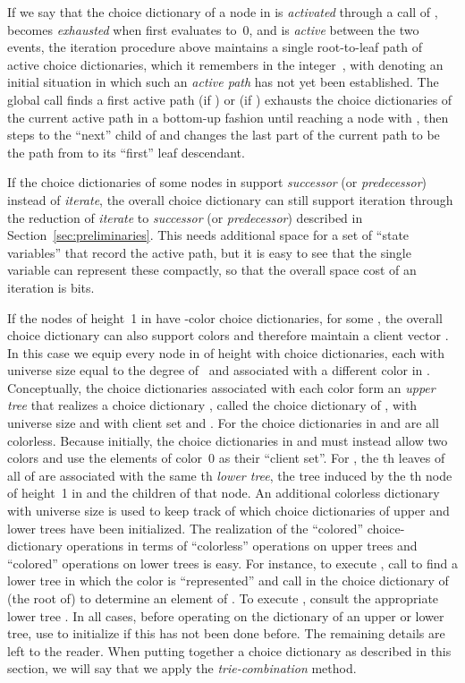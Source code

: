 \documentclass[envcountsame,envcountsect,undated,nolinenumbers]{lnthi}
\def\Tvn#1{\hbox{\textit{#1\/}}}
\begin{document}
\noindent
If we say that the choice dictionary of
a node  in  is \emph{activated}
through a call of ,
becomes \emph{exhausted} when
 first evaluates to~0,
and is \emph{active} between the two events,
the iteration procedure above maintains a single
root-to-leaf path of active choice dictionaries,
which it remembers in the integer~, with
 denoting an initial situation in which
such an \emph{active path} has not yet been
established.
The global call 
finds a first active path (if ) or
(if ) exhausts the choice dictionaries of 
the current active path in a bottom-up fashion
until reaching a node  with
,
then steps to the ``next'' child  of  and
changes the last part of the current path to
be the path from  to its ``first'' leaf descendant.

If the choice dictionaries of some nodes in 
support \Tvn{successor} (or \Tvn{predecessor})
instead of \Tvn{iterate}, the overall choice dictionary
can still support iteration through the reduction
of \Tvn{iterate} to
\Tvn{successor} (or \Tvn{predecessor})
described in Section~\ref{sec:preliminaries}.
This needs additional space for a set of
``state variables'' that record the active path,
but it is easy to see that
the single variable  can
represent these compactly,
so that the overall space cost of an iteration
is  bits.

If the nodes of height~1 in  have
-color choice dictionaries, for some ,
the overall choice dictionary can also support
 colors and therefore maintain a client vector
.
In this case we equip every node  in 
of height  with 
choice dictionaries, each with universe size
equal to the degree of~ and associated
with a different color in .
Conceptually, the choice dictionaries
associated with each color 
form an \emph{upper tree}  that realizes a 
choice dictionary , called the
choice dictionary of , with
universe size 
and with client set
 and
.
For  the choice dictionaries
in  and  are all colorless.
Because  initially, the choice dictionaries
in  and  must instead allow
two colors and use the elements of color~0
as their ``client set''.
For ,
the th leaves of all of 
are associated with the same th
\emph{lower tree}, the tree induced
by the th node of height~1 in  and the children of that node.
An additional colorless dictionary 
with universe size  is used to keep
track of which choice dictionaries of upper and lower trees
have been initialized.
The realization of the ``colored'' choice-dictionary
operations in terms of ``colorless'' operations on
upper trees and ``colored'' operations on lower
trees is easy.
For instance,
to execute ,
call  to find a lower tree 
in which the color  is ``represented'' and
call  in the choice dictionary
of (the root of)  to determine an element of .
To execute , consult the appropriate
lower tree .
In all cases, before operating on the
dictionary  of an upper or
lower tree, use  to initialize 
if this has not been done before.
The remaining details are left to the reader.
When putting together a choice dictionary as described
in this section, we will say that we apply the
\emph{trie-combination} method.
\end{document}
